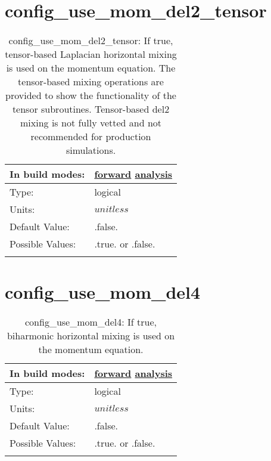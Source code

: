 \section[config\_use\_mom\_del2\_tensor]{config\_use\_mom\_del2\_tensor}
\label{sec:nm_sec_config_use_mom_del2_tensor}
\begin{center}
\begin{longtable}{| p{2.0in} || p{4.0in} |}
    \hline
    In build modes: & \hyperref[subsec:forward_nm_tab_hmix_del2_tensor]{forward} \hyperref[subsec:analysis_nm_tab_hmix_del2_tensor]{analysis} \\
    \hline
    Type: & logical \\
    \hline
    Units: & $unitless$ \\
    \hline
    Default Value: & .false. \\
    \hline
    Possible Values: & .true. or .false. \\
    \hline
    \caption{config\_use\_mom\_del2\_tensor: If true, tensor-based Laplacian horizontal mixing is used on the momentum equation. The tensor-based mixing operations are provided to show the functionality of the tensor subroutines. Tensor-based del2 mixing is not fully vetted and not recommended for production simulations.}
\end{longtable}
\end{center}
\section[config\_use\_mom\_del4]{config\_use\_mom\_del4}
\label{sec:nm_sec_config_use_mom_del4}
\begin{center}
\begin{longtable}{| p{2.0in} || p{4.0in} |}
    \hline
    In build modes: & \hyperref[subsec:forward_nm_tab_hmix_del4]{forward} \hyperref[subsec:analysis_nm_tab_hmix_del4]{analysis} \\
    \hline
    Type: & logical \\
    \hline
    Units: & $unitless$ \\
    \hline
    Default Value: & .false. \\
    \hline
    Possible Values: & .true. or .false. \\
    \hline
    \caption{config\_use\_mom\_del4: If true, biharmonic horizontal mixing is used on the momentum equation.}
\end{longtable}
\end{center}
